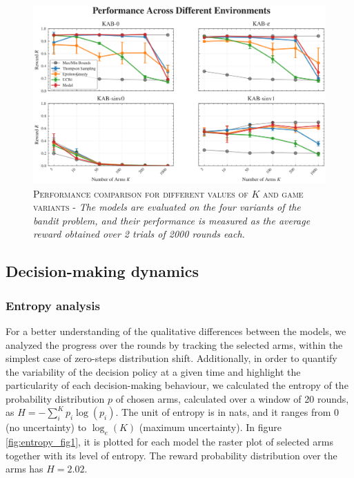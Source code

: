 \begin{figure}[H]
    \centering
    \includegraphics[width=1.\textwidth]{figures/performance_plot.png}
    \caption{\textsc{Performance comparison for different values of $K$ and game variants} - \textit{The models are evaluated on the four variants of the bandit problem, and their performance is measured as the average reward obtained over 2 trials of 2000 rounds each.}}
    \label{fig:perf_plot}
\end{figure}


\subsection{Decision-making dynamics}

\subsubsection{Entropy analysis}\label{sec:entropy}
\noindent For a better understanding of the qualitative differences between the models, we analyzed the progress over the rounds by tracking the selected arms, within the simplest case of zero-steps distribution shift.
Additionally, in order to quantify the variability of the decision policy at a given time and highlight the particularity of each decision-making behaviour, we calculated the entropy of the probability distribution $p$ of chosen arms, calculated over a window of 20 rounds, as $H=-\sum^{K}_{i} p_{i}\log(p_{i})$.
The unit of entropy is in nats, and it ranges from $0$ (no uncertainty) to $\log_{e}(K)$ (maximum uncertainty).
In figure \ref{fig:entropy_fig1}, it is plotted for each model the raster plot of selected arms together with its level of entropy. The reward probability distribution over the arms has $H=2.02$.


